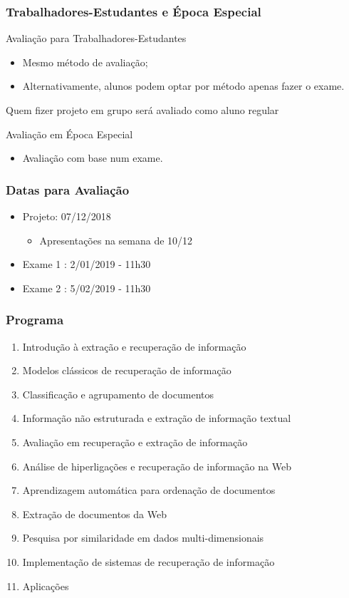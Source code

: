 \documentclass{beamer}
\begin{document}
\begin{frame} 
    \frametitle{Trabalhadores-Estudantes e Época Especial} 
   \begin{block}{Avaliação para Trabalhadores-Estudantes}
   \begin{itemize}
    \item Mesmo método de avaliação;
	\item Alternativamente, alunos podem optar por método apenas fazer o exame.
   \end{itemize}
   Quem fizer projeto em grupo será avaliado como aluno regular
   \end{block}
   \begin{block}{Avaliação em Época Especial}
   \begin{itemize}
   \item Avaliação com base num exame.
   \end{itemize}
   \end{block}
\end{frame}

\begin{frame} 
    \frametitle{Datas para Avaliação}
    \begin{itemize}
	\item Projeto: 07/12/2018
        \begin{itemize}
        \item Apresentações na semana de 10/12
        \end{itemize}
    \item Exame 1 : 2/01/2019 - 11h30
    \item Exame 2 : 5/02/2019 - 11h30
    \end{itemize}
\end{frame}


\begin{frame} 
    \frametitle{Programa}
    \begin{enumerate}
    \footnotesize
	\item Introdução à extração e recuperação de informação 
	\item Modelos clássicos de recuperação de informação
    \item Classificação e agrupamento de documentos
	\item Informação não estruturada e extração de informação textual
	\item Avaliação em recuperação e extração de informação 
	\item Análise de hiperligações e recuperação de informação na Web
    \item Aprendizagem automática para ordenação de documentos
    \item Extração de documentos da Web
	\item Pesquisa por similaridade em dados multi-dimensionais 
	\item Implementação de sistemas de recuperação de informação
	\item Aplicações
	\end{enumerate}
\end{frame}
\end{document}
